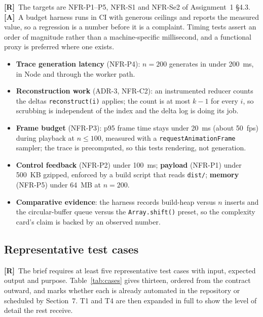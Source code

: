 \documentclass[11pt,a4paper]{article}
\newcommand{\R}{\textcolor{reqc}{\textbf{[R]}}}     %
\newcommand{\A}{\textcolor{asmc}{\textbf{[A]}}}     %
\newcommand{\ct}[1]{\texttt{#1}}
\begin{document}
\R\ The targets are NFR-P1--P5, NFR-S1 and NFR-Se2 of Assignment~1 \S4.3. \A\ A budget harness
runs in CI with generous ceilings and reports the measured value, so a regression is a number
before it is a complaint. Timing tests assert an order of magnitude rather than a
machine-specific millisecond, and a functional proxy is preferred where one exists.

\begin{itemize}[leftmargin=1.4em,topsep=2pt,itemsep=1pt]
  \item \textbf{Trace generation latency} (NFR-P4): $n = 200$ generates in under 200~ms, in
        Node and through the worker path.
  \item \textbf{Reconstruction work} (ADR-3, NFR-C2): an instrumented reducer counts the deltas
        \ct{reconstruct(i)} applies; the count is at most $k-1$ for every $i$, so scrubbing is
        independent of the index and the delta log is doing its job.
  \item \textbf{Frame budget} (NFR-P3): p95 frame time stays under 20~ms (about 50~fps) during
        playback at $n \le 100$, measured with a \ct{requestAnimationFrame} sampler; the trace
        is precomputed, so this tests rendering, not generation.
  \item \textbf{Control feedback} (NFR-P2) under 100~ms; \textbf{payload} (NFR-P1) under 500~KB
        gzipped, enforced by a build script that reads \ct{dist/}; \textbf{memory} (NFR-P5)
        under 64~MB at $n = 200$.
  \item \textbf{Comparative evidence}: the harness records build-heap versus $n$ inserts and the
        circular-buffer queue versus the \ct{Array.shift()} preset, so the complexity card's
        claim is backed by an observed number.
\end{itemize}

\subsection{Representative test cases}

\R\ The brief requires at least five representative test cases with input, expected output
and purpose. Table~\ref{tab:cases} gives thirteen, ordered from the contract outward, and
marks whether each is already automated in the repository or scheduled by Section~7. T1 and
T4 are then expanded in full to show the level of detail the rest receive.
\end{document}
